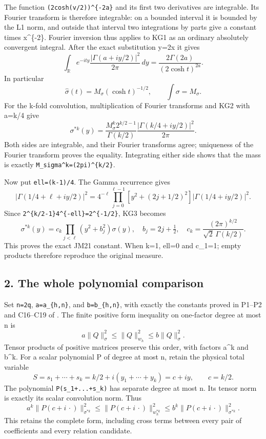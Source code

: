 \documentclass[11pt]{article}
\begin{document}
The function \texttt{(2cosh(v/2))\^{}\{-2a\}} and its first two derivatives are integrable. Its Fourier transform is therefore integrable: on a bounded interval it is bounded by the L1 norm, and outside that interval two integrations by parts give a constant times \textbar x\textbar\^{}\{-2\}. Fourier inversion thus applies to KG1 as an ordinary absolutely convergent integral. After the exact substitution y=2x it gives \[
\int_{\mathbb R}e^{-ity}
\frac{|\Gamma(a+iy/2)|^2}{2\pi}\,dy
=\frac{2\Gamma(2a)}{(2\cosh t)^{2a}}.
\tag{KG2}
\] In particular \[
\widehat\sigma(t)=M_\sigma(\cosh t)^{-1/2},\qquad
\int\sigma=M_\sigma.
\] For the k-fold convolution, multiplication of Fourier transforms and KG2 with a=k/4 give \[
\sigma^{*k}(y)=
\frac{M_\sigma^k2^{k/2-1}}{\Gamma(k/2)}
\frac{|\Gamma(k/4+iy/2)|^2}{2\pi}.
\tag{KG3}
\] Both sides are integrable, and their Fourier transforms agree; uniqueness of the Fourier transform proves the equality. Integrating either side shows that the mass is exactly \texttt{M\_sigma\^{}k=(2pi)\^{}\{k/2\}}.

Now put \texttt{ell=(k-1)/4}. The Gamma recurrence gives \[
|\Gamma(1/4+\ell+iy/2)|^2
=4^{-\ell}\prod_{j=0}^{\ell-1}
 \left[y^2+(2j+1/2)^2\right]|\Gamma(1/4+iy/2)|^2.
\] Since \texttt{2\^{}\{k/2-1\}4\^{}\{-ell\}=2\^{}\{-1/2\}}, KG3 becomes \[
\boxed{\sigma^{*k}(y)=c_k\prod_{j<\ell}(y^2+b_j^2)\sigma(y),
\quad b_j=2j+\tfrac12,\quad
c_k=\frac{(2\pi)^{k/2}}{\sqrt2\,\Gamma(k/2)}.}
\tag{KG4}
\] This proves the exact JM21 constant. When k=1, ell=0 and c\_1=1; empty products therefore reproduce the original measure.

\subsection{2. The whole polynomial comparison}\label{mrkg:the-whole-polynomial-comparison}

Set \texttt{n=2q}, \texttt{a=a\_\{h,n\}}, and \texttt{b=b\_\{h,n\}}, with exactly the constants proved in P1--P2 and C16--C19 of . The finite positive form inequality on one-factor degree at most n is \[
a\|Q\|_\sigma^2\le\|Q\|_{w_h}^2\le b\|Q\|_\sigma^2.
\] Tensor products of positive matrices preserve this order, with factors a\^{}k and b\^{}k. For a scalar polynomial P of degree at most n, retain the physical total variable \[
S=s_1+\cdots+s_k=k/2+i(y_1+\cdots+y_k)=c+iy,
\qquad c=k/2.
\] The polynomial \texttt{P(s\_1+...+s\_k)} has separate degree at most n. Its tensor norm is exactly its scalar convolution norm. Thus \[
a^k\|P(c+i\,\cdot)\|_{\sigma^{*k}}^2
\le\|P(c+i\,\cdot)\|_{w_h^{*k}}^2
\le b^k\|P(c+i\,\cdot)\|_{\sigma^{*k}}^2.
\tag{KG5}
\] This retains the complete form, including cross terms between every pair of coefficients and every relation candidate.
\end{document}
